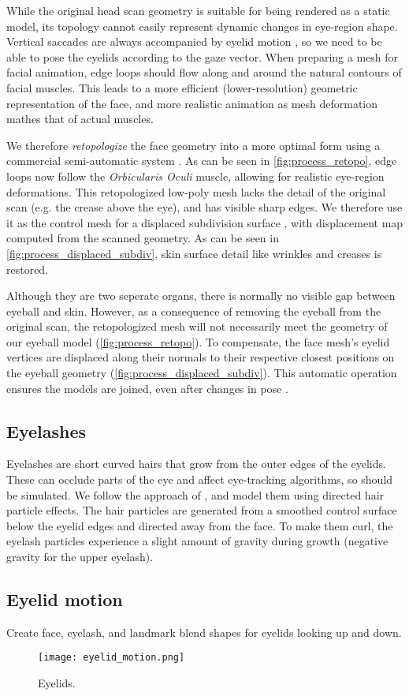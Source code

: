 While the original head scan geometry is suitable for being rendered as a static model, its topology cannot easily represent dynamic changes in eye-region shape. Vertical saccades are always accompanied by eyelid motion \cite{liversedge2011oxford}, so we need to be able to pose the eyelids according to the gaze vector. When preparing a mesh for facial animation, edge loops should flow along and around the natural contours of facial muscles. This leads to a more efficient (lower-resolution) geometric representation of the face, and more realistic animation as mesh deformation mathes that of actual muscles.

We therefore \emph{retopologize} the face geometry into a more optimal form using a commercial semi-automatic system \cite{ZRemesher}.  As can be seen in \autoref{fig:process_retopo}, edge loops now follow the \emph{Orbicularis Oculi} muscle, allowing for realistic eye-region deformations. This retopologized low-poly mesh lacks the detail of the original scan (e.g. the crease above the eye), and has visible sharp edges. We therefore use it as the control mesh for a displaced subdivision surface \cite{lee2000displaced}, with displacement map computed from the scanned geometry. As can be seen in \autoref{fig:process_displaced_subdiv}, skin surface detail like wrinkles and creases is  restored.

Although they are two seperate organs, there is normally no visible gap between eyeball and skin. However, as a consequence of removing the eyeball from the original scan, the retopologized mesh will not necessarily meet the geometry of our eyeball model (\autoref{fig:process_retopo}). To compensate, the face mesh's eyelid vertices are displaced along their normals to their respective closest positions on the eyeball geometry (\autoref{fig:process_displaced_subdiv}). This automatic operation ensures the models are joined, even after changes in pose \cite{Shrinkwrap}.

\subsection{Eyelashes}

Eyelashes are short curved hairs that grow from the outer edges of the eyelids. These can occlude parts of the eye and affect eye-tracking algorithms, so should be simulated. We follow the approach of \citet{swirski2014rendering}, and model them using directed hair particle effects. The hair particles are generated from a smoothed control surface below the eyelid edges and directed away from the face. To make them curl, the eyelash particles experience a slight amount of gravity during growth (negative gravity for the upper eyelash).

\subsection{Eyelid motion}

Create face, eyelash, and landmark blend shapes for eyelids looking up and down.

\begin{figure}
    \texttt{[image: eyelid\_motion.png]}
    \caption{Eyelids.}
\end{figure}